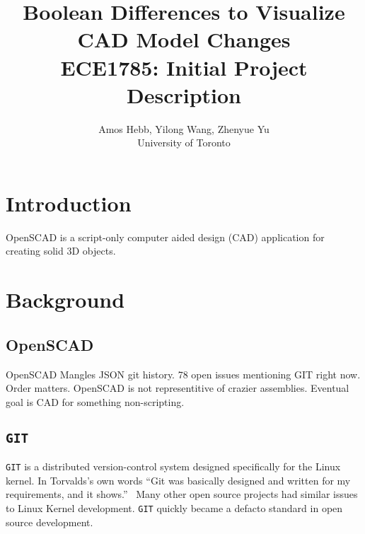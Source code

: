 \documentclass[sigconf]{acmart}
\begin{document}
\title{Boolean Differences to Visualize CAD Model Changes\\
{\normalsize ECE1785: Initial Project Description}}

\author{Amos Hebb, Yilong Wang, Zhenyue Yu\\ \small University of Toronto}

\maketitle






\section{Introduction}

OpenSCAD is a script-only computer aided design (CAD) application for creating solid 3D objects.

\section{Background}

\subsection{OpenSCAD}
OpenSCAD Mangles JSON git history.
78 open issues mentioning GIT right now.
Order matters.
OpenSCAD is not representitive of crazier assemblies.
Eventual goal is CAD for something non-scripting.

\subsection{\texttt{GIT}}

\texttt{GIT} is a distributed version-control system designed specifically for the Linux kernel.
In Torvalds's own words ``Git was basically designed and written for my requirements, and it shows.''~\cite{https://www.linuxfoundation.org/blog/blog/10-years-of-git-an-interview-with-git-creator-linus-torvalds}
Many other open source projects had similar issues to Linux Kernel development.
\texttt{GIT} quickly became a defacto standard in open source development.
\end{document}
